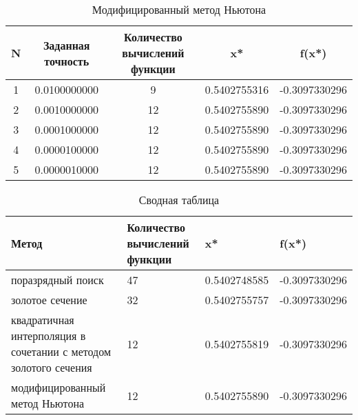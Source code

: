 \begin{table}[h]
\caption{Модифицированный метод Ньютона}
\centering
\begin{tabular}{| c | c | c | c | c |} \hline 
 N & Заданная точность & Количество вычислений функции & x* & f(x*) \\ 
 \hline 
  1 &    0.0100000000 &     9 &    0.5402755316 &   -0.3097330296 \\\hline 
  2 &    0.0010000000 &    12 &    0.5402755890 &   -0.3097330296 \\\hline 
  3 &    0.0001000000 &    12 &    0.5402755890 &   -0.3097330296 \\\hline 
  4 &    0.0000100000 &    12 &    0.5402755890 &   -0.3097330296 \\\hline 
  5 &    0.0000010000 &    12 &    0.5402755890 &   -0.3097330296 \\\hline 
\end{tabular}
\end{table}
\begin{table}[h]
\caption{Сводная таблица}
\begin{tabular}{|p{5cm}|p{3cm}|p{4cm}|p{4cm}|}\hline 
 Метод & Количество вычислений функции & x* & f(x*) \\ 
 \hline 
поразрядный поиск &    47 &    0.5402748585 &   -0.3097330296 \\ 
 \hline 
золотое сечение &    32 &    0.5402755757 &   -0.3097330296 \\ 
 \hline 
квадратичная интерполяция в сочетании с методом золотого сечения &    12 &    0.5402755819 &   -0.3097330296 \\ 
 \hline 
модифицированный метод Ньютона &    12 &    0.5402755890 &   -0.3097330296 \\ 
 \hline 
\end{tabular}
\end{table}
